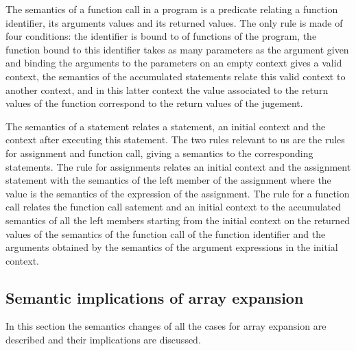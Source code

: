 \documentclass{article}
\begin{document}
The semantics of a function call in a program is a predicate relating a function
identifier, its arguments values and its returned values. The only rule is made
of four conditions: the identifier is bound to of functions of the program, the
function bound to this identifier takes as many parameters as the argument given
and binding the arguments to the parameters on an empty context gives a valid
context, the semantics of the accumulated statements relate this valid context
to another context, and in this latter context the value associated to the
return values of the function correspond to the return values of the jugement.

\smallskip

The semantics of a statement relates a statement, an initial context and the
context after executing this statement. The two rules relevant to us are the
rules for assignment and function call, giving a semantics to the corresponding
statements. The rule for assignments relates an initial context and the assignment
statement with the semantics of the left member of the assignment where the
value is the semantics of the expression of the assignment. The rule for a
function call relates the function call satement and an initial context to the
accumulated semantics of all the left members starting from the initial context
on the returned values of the semantics of the function call of the function
identifier and the arguments obtained by the semantics of the argument
expressions in the initial context.


\subsection{Semantic implications of array expansion}

In this section the semantics changes of all the cases for array expansion are
described and their implications are discussed.
\end{document}
